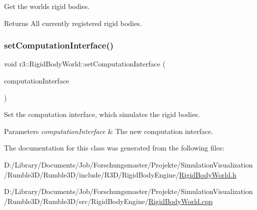 Get the world\textquotesingle{}s rigid bodies. 

\begin{DoxyReturn}{Returns}
All currently registered rigid bodies. 
\end{DoxyReturn}
\mbox{\label{classr3_1_1_rigid_body_world_a0c5724007917231ebe9bd970d65b0bfe}} 
\subsubsection{\texorpdfstring{set\+Computation\+Interface()}{setComputationInterface()}}
{\footnotesize\ttfamily void r3\+::\+Rigid\+Body\+World\+::set\+Computation\+Interface (\begin{DoxyParamCaption}\item[{\mbox{\hyperlink{classr3_1_1_rigid_body_engine_c_i}{Rigid\+Body\+Engine\+CI}} $\ast$}]{computation\+Interface }\end{DoxyParamCaption})}



Set the computation interface, which simulates the rigid bodies. 


\begin{DoxyParams}{Parameters}
{\em computation\+Interface} & The new computation interface. \\
\hline
\end{DoxyParams}


The documentation for this class was generated from the following files\+:\begin{DoxyCompactItemize}
\item 
D\+:/\+Library/\+Documents/\+Job/\+Forschungsmaster/\+Projekte/\+Simulation\+Visualization/\+Rumble3\+D/\+Rumble3\+D/include/\+R3\+D/\+Rigid\+Body\+Engine/\mbox{\hyperlink{_rigid_body_world_8h}{Rigid\+Body\+World.\+h}}\item 
D\+:/\+Library/\+Documents/\+Job/\+Forschungsmaster/\+Projekte/\+Simulation\+Visualization/\+Rumble3\+D/\+Rumble3\+D/src/\+Rigid\+Body\+Engine/\mbox{\hyperlink{_rigid_body_world_8cpp}{Rigid\+Body\+World.\+cpp}}\end{DoxyCompactItemize}
